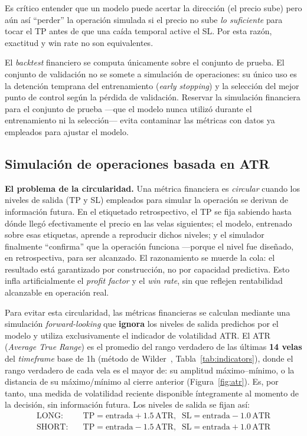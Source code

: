 \documentclass[10pt,twocolumn]{article}
\begin{document}
Es cr\'itico entender que un modelo puede acertar la direcci\'on (el precio sube) pero a\'un as\'i ``perder'' la operaci\'on simulada si el precio no sube \textit{lo suficiente} para tocar el TP antes de que una ca\'ida temporal active el SL. Por esta raz\'on, exactitud y win rate no son equivalentes.

El \textit{backtest} financiero se computa \'unicamente sobre el conjunto de prueba. El conjunto de validaci\'on no se somete a simulaci\'on de operaciones: su \'unico uso es la detenci\'on temprana del entrenamiento (\textit{early stopping}) y la selecci\'on del mejor punto de control seg\'un la p\'erdida de validaci\'on. Reservar la simulaci\'on financiera para el conjunto de prueba ---que el modelo nunca utiliz\'o durante el entrenamiento ni la selecci\'on--- evita contaminar las m\'etricas con datos ya empleados para ajustar el modelo.

\subsection{Simulaci\'on de operaciones basada en ATR}

\textbf{El problema de la circularidad.} Una m\'etrica financiera es \textit{circular} cuando los niveles de salida (TP y SL) empleados para simular la operaci\'on se derivan de informaci\'on futura. En el etiquetado retrospectivo, el TP se fija sabiendo hasta d\'onde lleg\'o efectivamente el precio en las velas siguientes; el modelo, entrenado sobre esas etiquetas, aprende a reproducir dichos niveles; y el simulador finalmente ``confirma'' que la operaci\'on funciona ---porque el nivel fue dise\~nado, en retrospectiva, para ser alcanzado. El razonamiento se muerde la cola: el resultado est\'a garantizado por construcci\'on, no por capacidad predictiva. Esto infla artificialmente el \textit{profit factor} y el \textit{win rate}, sin que reflejen rentabilidad alcanzable en operaci\'on real.

Para evitar esta circularidad, las m\'etricas financieras se calculan mediante una simulaci\'on \textit{forward-looking} que \textbf{ignora} los niveles de salida predichos por el modelo y utiliza exclusivamente el indicador de volatilidad ATR. El ATR (\textit{Average True Range}) es el promedio del rango verdadero de las \'ultimas \textbf{14 velas} del \textit{timeframe} base de 1h (m\'etodo de Wilder~\cite{wilder1978}, Tabla~\ref{tab:indicators}), donde el rango verdadero de cada vela es el mayor de: su amplitud m\'aximo--m\'inimo, o la distancia de su m\'aximo/m\'inimo al cierre anterior (Figura~\ref{fig:atr}). Es, por tanto, una medida de volatilidad reciente disponible \'integramente al momento de la decisi\'on, sin informaci\'on futura. Los niveles de salida se fijan as\'i:
{\footnotesize
\begin{align*}
\text{LONG:}  &\quad \text{TP} = \text{entrada} + 1.5\,\text{ATR}, \;\; \text{SL} = \text{entrada} - 1.0\,\text{ATR} \\
\text{SHORT:} &\quad \text{TP} = \text{entrada} - 1.5\,\text{ATR}, \;\; \text{SL} = \text{entrada} + 1.0\,\text{ATR}
\end{align*}}
\end{document}
